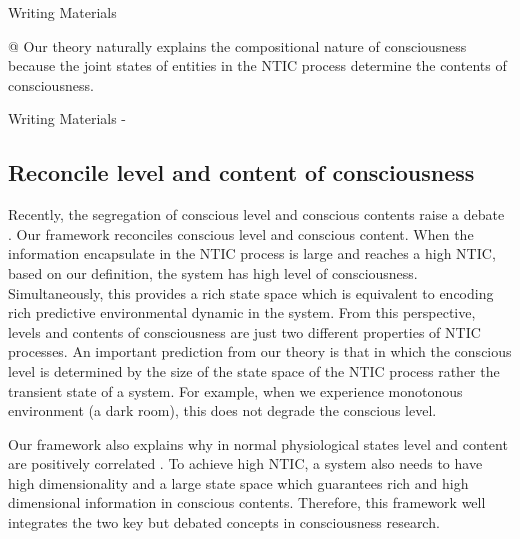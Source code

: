 \documentclass[utf8]{article}
\newenvironment{WritingMaterials} %
    	{
            \begin{tcolorbox}[enhanced,
                title=-,
                size=small,
                colbacktitle=Aquamarine,
                drop fuzzy shadow,
                fontupper=\small,
                boxrule=0.4pt,
                colback=Aquamarine!10!white,
                sharp corners]
                Writing Materials
            \end{tcolorbox}
            \begin{easylist}[itemize]
    	}
    	{
            \end{easylist}  
            \begin{tcolorbox}[enhanced,
                halign=flush right,
                halign title=right,
                size=small,
                colbacktitle=Aquamarine,
                drop fuzzy shadow,
                fontupper=\small,
                boxrule=0.4pt,
                colback=Aquamarine,
                colupper=White,
                sharp corners]
                Writing Materials -
            \end{tcolorbox}        
    	}
\newcommand{\needfig}[1]{%
			\ifthenelse{\equal{#1}{}}{%
				\todo[color=White, linecolor=Orange, bordercolor=RedOrange]{\textcolor{RedOrange}{Fig}}}{%
				\todo[color=White, linecolor=Orange, bordercolor=RedOrange]{\textcolor{RedOrange}{Fig: #1}}%
			}%
		}
\begin{document}
        
		\begin{WritingMaterials}
            @ Our theory naturally explains the compositional nature of consciousness because the joint states of entities in the NTIC process determine the contents of consciousness.

		\end{WritingMaterials}
			
			
			
	    \subsection{Reconcile level and content of consciousness}
	    Recently, the segregation of conscious level and conscious contents raise a debate \citep{bayne2016there, Fazekas2016}. Our framework reconciles conscious level and conscious content. When the information encapsulate in the NTIC process is large and reaches a high NTIC, based on our definition, the system has high level of consciousness. Simultaneously, this provides a rich state space which is equivalent to encoding rich predictive environmental dynamic in the system. From this perspective, levels and contents of consciousness are just two different properties of NTIC processes. An important prediction from our theory is that in which the conscious level is determined by the size of the state space of the NTIC process rather the transient state of a system. For example, when we experience monotonous environment (a dark room), this does not degrade the conscious level.
	    
	    Our framework also explains why in normal physiological states level and content are positively correlated \citep{laureys2005neural}\needfig{}. To achieve high NTIC, a system also needs to have high dimensionality and a large state space which guarantees rich and high dimensional information in conscious contents. Therefore, this framework well integrates the two key but debated concepts in consciousness research. 
			
			
			
\end{document}
